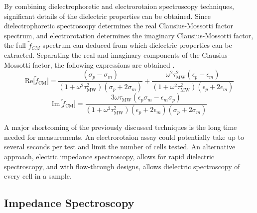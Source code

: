  \par By combining dielectrophoretic and electrorotaion spectroscopy techniques, significant details of the dielectric properties can be obtained. Since dielectrophoretic spectroscopy determines the real Clausius-Mossotti factor spectrum, and electrorotation determines the imaginary Clausius-Mossotti factor, the full $\tilde{f}_{CM}$ spectrum can deduced from which dielectric properties can be extracted. Separating the real and imaginary components of the Clausius-Mossotti factor, the following expressions are obtained \cite{hober_zweites_1912, morgan_single_2007}.
 \begin{equation}
     \text{Re}\big[\tilde{f}_{\text{CM}}\big] = \frac{(\sigma_p - \sigma_m)}{(1+\omega^2\tau_{\text{MW}}^2)(\sigma_p + 2\sigma_m)} + \frac{\omega^2\tau^2_{\text{MW}}(\epsilon_p-\epsilon_m)}{(1+\omega^2\tau_{\text{MW}}^2)(\epsilon_p+2\epsilon_m)}
 \end{equation}
 \begin{equation}
     \text{Im}\big[\tilde{f}_{\text{CM}} \big] = \frac{3\omega\tau_{\text{MW}}(\epsilon_p\sigma_m-\epsilon_m\sigma_p)}{(1+\omega^2\tau^2_{\text{MW}})(\epsilon_p+2\epsilon_m)(\sigma_p+2\sigma_m)}
 \end{equation}
 \par A major shortcoming of the previously discussed techniques is the long time needed for measurements. An electrorotaion assay could potentially take up to several seconds per test and limit the number of cells tested. An alternative approach, electric impedance spectroscopy, allows for rapid dielectric spectroscopy, and with flow-through designs, allows dielectric spectroscopy of every cell in a sample. 
 
 \subsection{Impedance Spectroscopy}
 \label{sec:impedance_spectroscopy}
